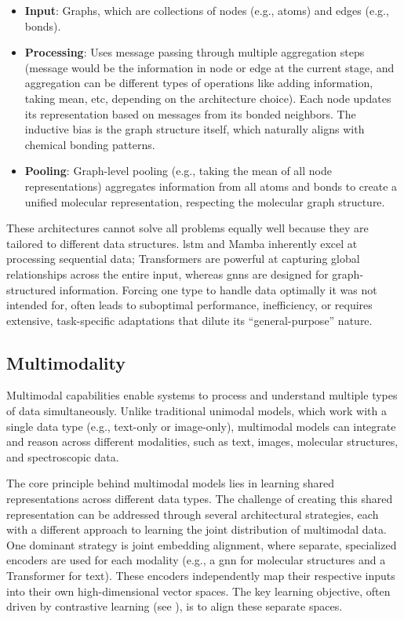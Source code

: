 \begin{itemize}
    \item \textbf{Input}: Graphs, which are collections of nodes (e.g., atoms) and edges (e.g., bonds).
    \item \textbf{Processing}: Uses message passing through multiple aggregation steps (message would be the information in node or edge at the current stage, and aggregation can be different types of operations like adding information, taking mean, etc, depending on the architecture choice). Each node updates its representation based on messages from its bonded neighbors. The inductive bias is the graph structure itself, which naturally aligns with chemical bonding patterns.
    \item \textbf{Pooling}: Graph-level pooling (e.g., taking the mean of all node representations) aggregates information from all atoms and bonds to create a unified molecular representation, respecting the molecular graph structure.
\end{itemize}

\noindent These architectures cannot solve all problems equally well because they are tailored to different data structures. 
\gls{lstm} and Mamba inherently excel at processing sequential data; Transformers are powerful at capturing global relationships across the entire input,
whereas \glspl{gnn} are designed for graph-structured information. 
Forcing one type to handle data optimally it was not intended for, often leads to suboptimal performance, inefficiency, or requires extensive, task-specific adaptations that dilute its \enquote{general-purpose} nature.\autocite{alampara2024mattext}


\subsection{Multimodality}
Multimodal capabilities enable systems to process and understand multiple types of data simultaneously. 
Unlike traditional unimodal models, which work with a single data type (e.g., text-only or image-only), multimodal models can integrate and reason across different modalities, such as text, images, molecular structures, and spectroscopic data.

The core principle behind multimodal models lies in learning shared representations across different data types.  The challenge of creating this shared representation can be addressed through several architectural strategies, each with a different approach to learning the joint distribution of multimodal data. One dominant strategy is joint embedding alignment, where separate, specialized encoders are used for each modality (e.g., a \gls{gnn} for molecular structures and a Transformer for text). These encoders independently map their respective inputs into their own high-dimensional vector spaces. 
The key learning objective, often driven by contrastive learning (see ), is to align these separate spaces. 



